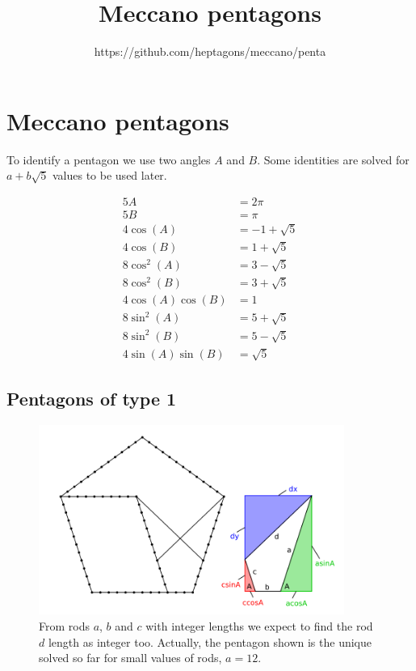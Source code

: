 \documentclass[11pt]{article}
\title{\textbf{Meccano pentagons}}
\author{https://github.com/heptagons/meccano/penta}
\date{}
\begin{document}
\maketitle

\section{Meccano pentagons}

To identify a pentagon we use two angles $A$ and $B$. Some identities are solved for $a + b\sqrt{5}$ values to be used later.

\begin{align*}
5A &= {2\pi} \\
5B &= {\pi} \\
4\cos(A) &=  -1 + \sqrt{5} \\
4\cos(B) &=   1 + \sqrt{5} \\
8\cos^2(A) &= { 3 - \sqrt{5}} \\
8\cos^2(B) &= { 3 + \sqrt{5}} \\
4\cos(A)\cos(B) &= 1 \\
8\sin^2(A) &= 5 + \sqrt{5} \\
8\sin^2(B) &= 5 - \sqrt{5} \\
4\sin(A)\sin(B) &= \sqrt{5}
\end{align*}

\subsection{Pentagons of type 1}

\begin{figure}
\centering
\includegraphics[width=10cm]{figs/pentagon-type-1}
\caption{From rods $a$, $b$ and $c$ with integer lengths we expect to find the rod $d$ length as integer too. Actually, the pentagon shown is the unique solved so far for small values of rods, $a=12$.}
\label{pentagon-type-1}
\end{figure}
\end{document}
